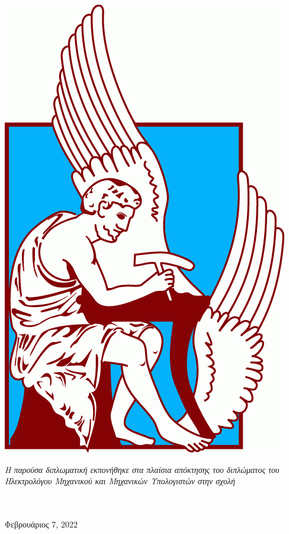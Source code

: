 \documentclass[
	12pt, %
	english, %
	onehalfspacing, %
	liststotoc, %
	toctotoc, %
	parskip, %
	headsepline, %
]{MastersDoctoralThesis} %
\begin{document}
\begin{titlepage}
\begin{center}
		\includegraphics[scale=0.22]{Images/TUC_logo.png} %
		\\[0.5cm]

		\vfill

		\large \textit{Η παρούσα διπλωματική εκπονήθηκε στα πλαίσια απόκτησης του διπλώματος του Ηλεκτρολόγου Μηχανικού και Μηχανικών Υπολογιστών στην σχολή}\\[0.1cm] %
		\deptname\\\groupname\\[0.4cm] %

		\vfill

		{\large Φεβρουάριος 7, 2022 }\\[2cm] %

		\vfill
	\end{center}
\end{titlepage}
\end{document}
